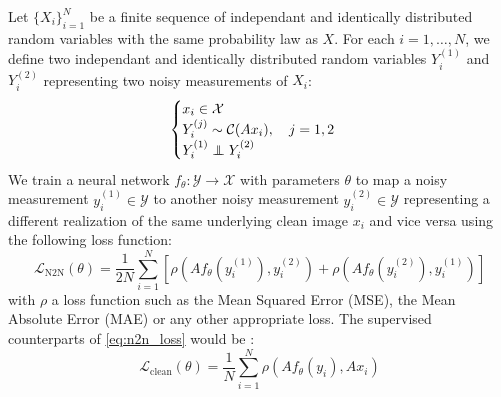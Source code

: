 Let $\{X_i\}_{i=1}^N$ be a finite sequence of independant and identically distributed random variables with the same probability law as $X$.
For each $i = 1, \dots, N$, we define two independant and identically distributed random variables $Y_i^{(1)}$ and $Y_i^{(2)}$ representing two noisy measurements of $X_i$:
\begin{equation}
    \begin{cases}
        x_i \in \mathcal{X} \\
        Y_i^{(j)} \sim \mathcal{C}(Ax_i), \quad j = 1, 2 \\
        Y_i^{(1)} \independent Y_i^{(2)}
    \end{cases}
\end{equation}
We train a neural network $f_\theta: \mathcal{Y} \to \mathcal{X}$ with parameters $\theta$ to map a noisy measurement $y_i^{(1)} \in \mathcal{Y}$ to another noisy measurement $y_i^{(2)} \in \mathcal{Y}$ representing a different realization of the same underlying clean image $x_i$ and vice versa using the following loss function:
\begin{equation}
    \mathcal{L}_{\text{N2N}}(\theta) = \frac{1}{2N} \sum_{i=1}^N \left[ \rho(Af_\theta(y_i^{(1)}), y_i^{(2)}) + \rho(Af_\theta(y_i^{(2)}), y_i^{(1)}) \right]
    \label{eq:n2n_loss}
\end{equation}
with $\rho$ a loss function such as the Mean Squared Error (MSE), the Mean Absolute Error (MAE) or any other appropriate loss.
The supervised counterparts of \eqref{eq:n2n_loss} would be :
\begin{equation}
    \mathcal{L}_{\text{clean}}(\theta) = \frac{1}{N} \sum_{i=1}^N \rho(Af_\theta(y_i), Ax_i) 
    \label{eq:supervised_loss}
\end{equation}

